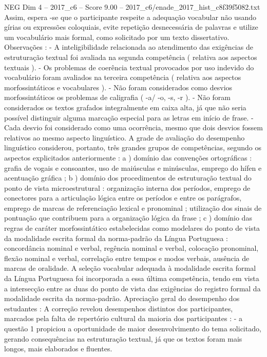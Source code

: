 \begin{textsample}{NEG Dim 4 – 2017\_c6 – Score 9.00 – 2017\_c6/enade\_2017\_hist\_c8f39f5082.txt}
Assim, espera -se que o participante respeite a adequação vocabular não usando gírias ou expressões coloquiais, evite repetição desnecessária de palavras e utilize um vocabulário mais formal, como solicitado por um texto dissertativo.
Observações : - A inteligibilidade relacionada ao atendimento das exigências de estruturação textual foi avaliada na segunda competência ( relativa aos aspectos textuais ). - Os problemas de coerência textual provocados por uso indevido do vocabulário foram avaliados na terceira competência ( relativa aos aspectos morfossintáticos e vocabulares ). - Não foram considerados como desvios morfossintáticos os problemas de caligrafia ( -a/ -o, -s, -r ). - Não foram considerados os textos grafados integralmente em caixa alta, já que não seria possível distinguir alguma marcação especial para as letras em início de frase. - Cada desvio foi considerado como uma ocorrência, mesmo que dois desvios fossem relativos ao mesmo aspecto linguístico.
A grade de avaliação do desempenho linguístico considerou, portanto, três grandes grupos de competências, segundo os aspectos explicitados anteriormente : a ) domínio das convenções ortográficas : grafia de vogais e consoantes, uso de maiúsculas e minúsculas, emprego do hífen e acentuação gráfica ; b ) domínio dos procedimentos de estruturação textual do ponto de vista microestrutural : organização interna dos períodos, emprego de conectores para a articulação lógica entre os períodos e entre os parágrafos, emprego de marcas de referenciação lexical e pronominal ; utilização dos sinais de pontuação que contribuem para a organização lógica da frase ; c ) domínio das regras de caráter morfossintático estabelecidas como modelares do ponto de vista da modalidade escrita formal da norma-padrão da Língua Portuguesa : concordância nominal e verbal, regência nominal e verbal, colocação pronominal, flexão nominal e verbal, correlação entre tempos e modos verbais, ausência de marcas de oralidade.
A seleção vocabular adequada à modalidade escrita formal da Língua Portuguesa foi incorporada a essa última competência, tendo em vista a intersecção entre as duas do ponto de vista das exigências do registro formal da modalidade escrita da norma-padrão.
Apreciação geral do desempenho dos estudantes : A correção revelou desempenhos distintos dos participantes, marcados pela falta de repertório cultural da maioria dos participantes : - a questão 1 propiciou a oportunidade de maior desenvolvimento do tema solicitado, gerando consequências na estruturação textual, já que os textos foram mais longos, mais elaborados e fluentes.

\end{textsample}
